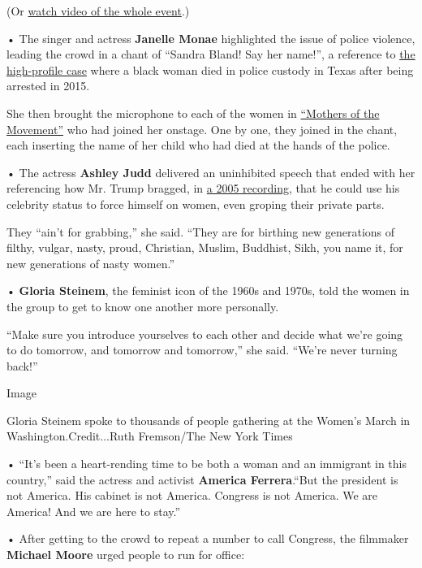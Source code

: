 (Or
\href{https://www.nytimes.com/video/us/politics/100000004879811/washington-march-live-video.html}{watch
video of the whole event}.)

• The singer and actress \textbf{Janelle Monae} highlighted the issue of
police violence, leading the crowd in a chant of ``Sandra Bland! Say her
name!'', a reference to
\href{https://www.nytimes.com/2016/04/13/us/panel-calls-for-major-changes-at-texas-jail-that-held-sandra-bland.html}{the
high-profile case} where a black woman died in police custody in Texas
after being arrested in 2015.

She then brought the microphone to each of the women in
\href{http://www.cnn.com/2016/07/26/politics/mothers-movement-dnc-hillary-clinton/}{``Mothers
of the Movement''} who had joined her onstage. One by one, they joined
in the chant, each inserting the name of her child who had died at the
hands of the police.

• The actress \textbf{Ashley Judd} delivered an uninhibited speech that
ended with her referencing how Mr. Trump bragged, in
\href{https://www.nytimes.com/2016/10/08/us/donald-trump-tape-transcript.html}{a
2005 recording}, that he could use his celebrity status to force himself
on women, even groping their private parts.

They ``ain't for grabbing,'' she said. ``They are for birthing new
generations of filthy, vulgar, nasty, proud, Christian, Muslim,
Buddhist, Sikh, you name it, for new generations of nasty women.''

• \textbf{Gloria Steinem}, the feminist icon of the 1960s and 1970s,
told the women in the group to get to know one another more personally.

``Make sure you introduce yourselves to each other and decide what we're
going to do tomorrow, and tomorrow and tomorrow,'' she said. ``We're
never turning back!''

Image

Gloria Steinem spoke to thousands of people gathering at the Women's
March in Washington.Credit...Ruth Fremson/The New York Times

• ``It's been a heart-rending time to be both a woman and an immigrant
in this country,'' said the actress and activist \textbf{America
Ferrera}.``But the president is not America. His cabinet is not America.
Congress is not America. We are America! And we are here to stay.''

• After getting to the crowd to repeat a number to call Congress, the
filmmaker \textbf{Michael Moore} urged people to run for office:

